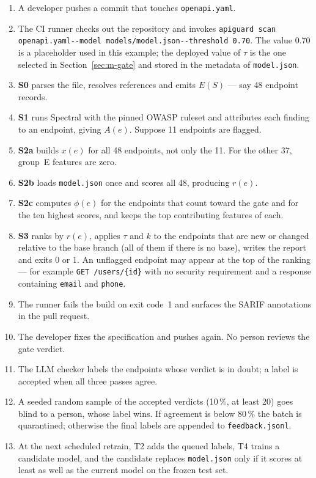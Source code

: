 \documentclass[conference]{IEEEtran}
\begin{document}
\begin{enumerate}
\item A developer pushes a commit that touches \texttt{openapi.yaml}.
\item The CI runner checks out the repository and invokes
\texttt{apiguard scan openapi.yaml}\linebreak[1]
\texttt{-{}-model models/model.json}\linebreak[1] \texttt{-{}-threshold 0.70}. The value
0.70 is a placeholder used in this example; the deployed value of $\tau$ is the one selected
in Section~\ref{sec:m-gate} and stored in the metadata of \texttt{model.json}.
\item \textbf{S0} parses the file, resolves references and emits $E(S)$ --- say 48 endpoint
records.
\item \textbf{S1} runs Spectral with the pinned OWASP ruleset and attributes each finding to
an endpoint, giving $A(e)$. Suppose 11 endpoints are flagged.
\item \textbf{S2a} builds $x(e)$ for all 48 endpoints, not only the 11. For the other 37,
group~E features are zero.
\item \textbf{S2b} loads \texttt{model.json} once and scores all 48, producing $r(e)$.
\item \textbf{S2c} computes $\phi(e)$ for the endpoints that count toward the gate and for the
ten highest scores, and keeps the top contributing features of each.
\item \textbf{S3} ranks by $r(e)$, applies $\tau$ and $k$ to the endpoints that are new or
changed relative to the base branch (all of them if there is no base), writes the report and
exits 0 or 1. An unflagged endpoint may appear at the top of the ranking --- for example
\texttt{GET /users/\{id\}} with no security requirement and a response containing
\texttt{email} and \texttt{phone}.
\item The runner fails the build on exit code~1 and surfaces the SARIF annotations in the
pull request.
\item The developer fixes the specification and pushes again. No person reviews the gate verdict.
\item The LLM checker labels the endpoints whose verdict is in doubt; a label is accepted when all three passes agree.
\item A seeded random sample of the accepted verdicts (10\,\%, at least 20) goes blind to a person, whose label wins. If agreement is below 80\,\% the batch is quarantined; otherwise the final labels are appended to \texttt{feedback.jsonl}.
\item At the next scheduled retrain, T2 adds the queued labels, T4 trains a candidate model,
and the candidate replaces \texttt{model.json} only if it scores at least as well as the
current model on the frozen test set.
\end{enumerate}
\end{document}

